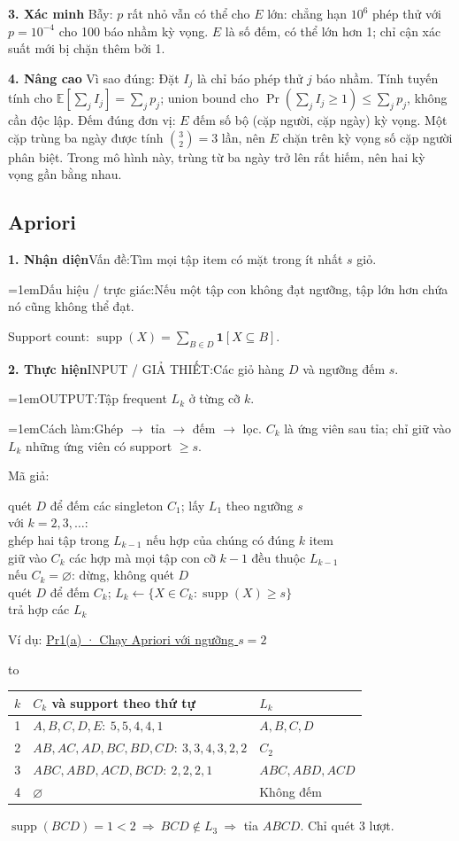 \documentclass[10pt,a4paper,twocolumn]{article}
\makeatletter
\newif\ifexamheadingprinted
\newcommand{\topic}[2]{%
  \global\examheadingprintedfalse\par\subsection{#2}\label{topic:#1}}
\newcommand{\key}[1]{#1:\enspace}
\newcommand{\blocklabel}[1]{\par\noindent#1\par\nobreak}
\newcommand{\qlink}[2]{\hyperref[question:#1]{#2}}
\newenvironment{example}[2]{%
  \par\addvspace{6pt}\noindent
  \raggedright
  \blocklabel{Ví dụ: \qlink{#1}{#2}}%
}{\par\addvspace{4pt}}
\newenvironment{examtable}[1]{%
  \par\addvspace{2pt}\noindent\hbox to \linewidth\bgroup\hfil
  \setlength{\tabcolsep}{4pt}%
  \renewcommand{\arraystretch}{1.12}\begin{tabular}{#1}%
}{\end{tabular}\hfil\egroup\par\addvspace{2pt}}
\newcommand{\algfield}[2]{\par\noindent\hangindent=1em\relax#1:\enspace#2}
\newcommand{\unitheading}[2]{%
  \par\addvspace{1pt}\noindent\textbf{#1. #2}\enspace}
\newcommand{\unitverification}{\unitheading{3}{Xác minh}}
\newcommand{\unitadvanced}{\unitheading{4}{Nâng cao}}
\newcommand{\unitfield}[4]{%
  \par\noindent\textbf{#1. #2}\enspace #3:\enspace #4}
\newcommand{\algsummary}[6]{%
  \begingroup\setlength{\parskip}{1pt}%
  \unitfield{1}{Nhận diện}{Vấn đề}{#1}%
  \algfield{Dấu hiệu / trực giác}{#2}%
  \if\relax\detokenize{#3}\relax\else\par\noindent#3\par\fi%
  \unitfield{2}{Thực hiện}{INPUT / GIẢ THIẾT}{#4}%
  \algfield{OUTPUT}{#5}%
  \algfield{Cách làm}{#6}\par\endgroup}
\newenvironment{algpseudo}{%
  \par\addvspace{2pt}\noindent
  \setlength{\parskip}{0pt}%
  Mã giả:\par\nobreak
  \begin{list}{}{\setlength{\leftmargin}{1em}\setlength{\topsep}{0pt}%
    \setlength{\partopsep}{0pt}\setlength{\parsep}{0pt}%
    \@beginparpenalty=10000\relax}%
  \item\relax
}{\end{list}\par\addvspace{3pt}}
\makeatother
\begin{document}
\unitverification
\key{Bẫy} $p$ rất nhỏ vẫn có thể cho $E$ lớn: chẳng hạn $10^6$ phép thử với $p=10^{-4}$ cho 100 báo nhầm kỳ vọng. $E$ là số đếm, có thể lớn hơn 1; chỉ cận xác suất mới bị chặn thêm bởi 1.

\unitadvanced
\key{Vì sao đúng} Đặt $I_j$ là chỉ báo phép thử $j$ báo nhầm. Tính tuyến tính cho $\mathbb E[\sum_j I_j]=\sum_jp_j$; union bound cho $\Pr(\sum_jI_j\ge1)\le\sum_jp_j$, không cần độc lập.
\key{Đếm đúng đơn vị} $E$ đếm số bộ (cặp người, cặp ngày) kỳ vọng. Một cặp trùng ba ngày được tính $\binom{3}{2}=3$ lần, nên $E$ chặn trên kỳ vọng số cặp người phân biệt. Trong mô hình này, trùng từ ba ngày trở lên rất hiếm, nên hai kỳ vọng gần bằng nhau.
\topic{apriori}{Apriori}

\algsummary{Tìm mọi tập item có mặt trong ít nhất $s$ giỏ.}{Nếu một tập con không đạt ngưỡng, tập lớn hơn chứa nó cũng không thể đạt.}{\key{Support count} $\operatorname{supp}(X)=\sum_{B\in D}\mathbf1[X\subseteq B]$.}{Các giỏ hàng $D$ và ngưỡng đếm $s$.}{Tập frequent $L_k$ ở từng cỡ $k$.}{Ghép $\to$ tỉa $\to$ đếm $\to$ lọc. $C_k$ là ứng viên sau tỉa; chỉ giữ vào $L_k$ những ứng viên có support $\ge s$.}

\begin{algpseudo}
quét $D$ để đếm các singleton $C_1$; lấy $L_1$ theo ngưỡng $s$\\
với $k=2,3,\ldots$:\\
\quad ghép hai tập trong $L_{k-1}$ nếu hợp của chúng có đúng $k$ item\\
\quad giữ vào $C_k$ các hợp mà mọi tập con cỡ $k-1$ đều thuộc $L_{k-1}$\\
\quad nếu $C_k=\varnothing$: dừng, không quét $D$\\
\quad quét $D$ để đếm $C_k$; $L_k\gets\{X\in C_k:\operatorname{supp}(X)\ge s\}$\\
trả hợp các $L_k$
\end{algpseudo}

\begin{example}{Pr1}{Pr1(a) · Chạy Apriori với ngưỡng $s=2$}
\begin{examtable}{@{}cll@{}}
\toprule
$k$ & $C_k$ và support theo thứ tự & $L_k$ \\
\midrule
1 & $A,B,C,D,E:\ 5,5,4,4,1$ & $A,B,C,D$ \\
2 & $AB,AC,AD,BC,BD,CD:\ 3,3,4,3,2,2$ & $C_2$ \\
3 & $ABC,ABD,ACD,BCD:\ 2,2,2,1$ & $ABC,ABD,ACD$ \\
4 & $\varnothing$ & Không đếm \\
\bottomrule
\end{examtable}
$\operatorname{supp}(BCD)=1<2\ \Rightarrow\ BCD\notin L_3\ \Rightarrow$ tỉa $ABCD$. Chỉ quét 3 lượt.
\end{example}
\end{document}
